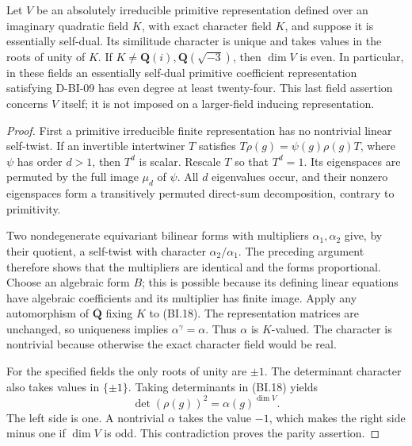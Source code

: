 \begin{proposition}
\label{D-BI-10}
Let $V$ be an absolutely irreducible primitive representation defined
over an imaginary quadratic field $K$, with exact character field
$K$, and suppose it is essentially self-dual.  Its similitude
character is unique and takes values in the roots of unity of $K$.
If $K\ne\mathbf Q(i),\mathbf Q(\sqrt{-3})$, then $\dim V$ is even.
In particular, in these fields an essentially self-dual primitive
coefficient representation satisfying D-BI-09 has even degree at
least twenty-four.  This last field assertion concerns $V$ itself;
it is not imposed on a larger-field inducing representation.
\end{proposition}
\begin{proof}
First a primitive irreducible finite representation has no nontrivial
linear self-twist.  If an invertible intertwiner $T$ satisfies
$T\rho(g)=\psi(g)\rho(g)T$, where $\psi$ has order $d>1$,
then $T^d$ is scalar.  Rescale $T$ so that $T^d=1$.
Its eigenspaces are permuted by the full image $\mu_d$ of $\psi$.
All $d$ eigenvalues occur, and their nonzero eigenspaces form a
transitively permuted direct-sum decomposition, contrary to primitivity.

Two nondegenerate equivariant bilinear forms with multipliers
$\alpha_1,\alpha_2$ give, by their quotient, a self-twist with
character $\alpha_2/\alpha_1$.  The preceding argument therefore
shows that the multipliers are identical and the forms proportional.
Choose an algebraic form $B$; this is possible because its defining
linear equations have algebraic coefficients and its multiplier has
finite image.  Apply any automorphism of $\overline{\mathbf Q}$
fixing $K$ to (BI.18).  The representation matrices are unchanged,
so uniqueness implies $\alpha^\gamma=\alpha$.  Thus $\alpha$
is $K$-valued.  The character is nontrivial because otherwise the
exact character field would be real.

For the specified fields the only roots of unity are $\pm1$.
The determinant character also takes values in $\{\pm1\}$.
Taking determinants in (BI.18) yields
\[
                   \det(\rho(g))^2=\alpha(g)^{\dim V}.
\]
The left side is one.  A nontrivial $\alpha$ takes the value $-1$,
which makes the right side minus one if $\dim V$ is odd.  This
contradiction proves the parity assertion.
\end{proof}
